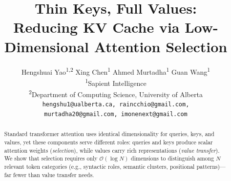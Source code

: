 \documentclass{article} %
\title{Thin Keys, Full Values: \\
Reducing KV Cache via Low-Dimensional Attention Selection}
\author{%
  Hengshuai Yao\textsuperscript{1,2} \quad Xing Chen\textsuperscript{1} \quad Ahmed Murtadha\textsuperscript{1} \quad Guan Wang\textsuperscript{1} \\
  \textsuperscript{1}Sapient Intelligence \\
  \textsuperscript{2}Department of Computing Science, University of Alberta \\
  \texttt{hengshu1@ualberta.ca, raincchio@gmail.com,} \\
  \texttt{murtadha20@gmail.com, imonenext@gmail.com}%
}
\newcommand{\BigO}{\mathcal{O}}
\begin{document}
\ifcolmsubmission
\linenumbers
\fi

\maketitle

\begin{abstract}
Standard transformer attention uses identical dimensionality for queries, keys, and values, yet these components serve different roles: queries and keys produce scalar attention weights (\emph{selection}), while values carry rich representations (\emph{value transfer}). We show that selection requires only $\BigO(\log N)$ dimensions to distinguish among $N$ relevant token categories (e.g., syntactic roles, semantic clusters, positional patterns)---far fewer than value transfer needs.


\end{abstract}
\end{document}
